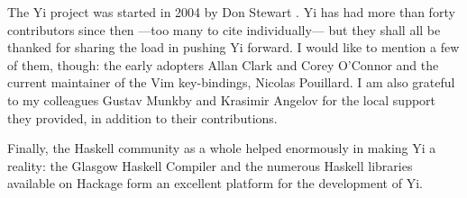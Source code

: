 \documentclass[9pt,indentedstyle,preprint]{sigplanconf}
\begin{document}
The Yi project was started in 2004 by Don Stewart
\cite{Stewart2005Dynamic}. Yi has had more than forty contributors
since then ---too many to cite individually--- but
they shall all be thanked for sharing the load in pushing Yi
forward. I would like to mention a few of them, though: the early
adopters Allan Clark and Corey O'Connor and the current maintainer of
the Vim key-bindings, Nicolas Pouillard. I am also grateful to my
colleagues Gustav Munkby and Krasimir Angelov for the local support
they provided, in addition to their contributions.

Finally, the Haskell community as a whole helped enormously in making
Yi a reality: the Glasgow Haskell Compiler and the numerous Haskell
libraries available on Hackage \cite{Hackage} form an excellent
platform for the development of Yi.



\end{document}
